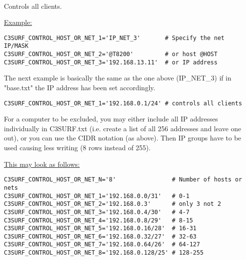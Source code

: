 \begin{itemize}
\begin{description}
\ \\

  Controls all clients.


\underline{Example:}

\begin{example}
\begin{verbatim}
C3SURF_CONTROL_HOST_OR_NET_1='IP_NET_3'       # Specify the net IP/MASK
C3SURF_CONTROL_HOST_OR_NET_2='@T8200'         # or host @HOST
C3SURF_CONTROL_HOST_OR_NET_3='192.168.13.11'  # or IP address
\end{verbatim}
\end{example}

The next example is basically the same as the one above (IP\_NET\_3) if in "base.txt" the
IP address has been set accordingly.

\begin{example}
\begin{verbatim}
C3SURF_CONTROL_HOST_OR_NET_1='192.168.0.1/24' # controls all clients
\end{verbatim}
\end{example}

For a computer to be excluded, you may either include all IP addresses
individually in C3SURF.txt (i.e. create a list of all 256 addresses
and leave one out), or you can use the CIDR notation (as above).
Then IP groups have to be used causing less writing (8 rows instead of 255).

\underline{This may look as follows:}

\begin{example}
\begin{verbatim}
C3SURF_CONTROL_HOST_OR_NET_N='8'                # Number of hosts or nets
C3SURF_CONTROL_HOST_OR_NET_1='192.168.0.0/31'   # 0-1
C3SURF_CONTROL_HOST_OR_NET_2='192.168.0.3'      # only 3 not 2
C3SURF_CONTROL_HOST_OR_NET_3='192.168.0.4/30'   # 4-7
C3SURF_CONTROL_HOST_OR_NET_4='192.168.0.8/29'   # 8-15
C3SURF_CONTROL_HOST_OR_NET_5='192.168.0.16/28'  # 16-31
C3SURF_CONTROL_HOST_OR_NET_6='192.168.0.32/27'  # 32-63
C3SURF_CONTROL_HOST_OR_NET_7='192.168.0.64/26'  # 64-127
C3SURF_CONTROL_HOST_OR_NET_8='192.168.0.128/25' # 128-255
\end{verbatim}
\end{example}


\end{description}
\end{itemize}
